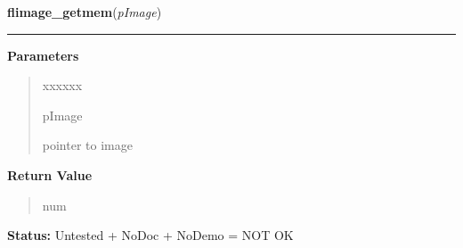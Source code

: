     \label{xformslib:flflimage:flimage_getmem}

    \vspace{0.5ex}

\hspace{.8\funcindent}\begin{boxedminipage}{\funcwidth}

    \raggedright \textbf{flimage\_getmem}(\textit{pImage})

    \vspace{-1.5ex}

    \rule{\textwidth}{0.5\fboxrule}
\setlength{\parskip}{2ex}
\setlength{\parskip}{1ex}
      \textbf{Parameters}
      \vspace{-1ex}

      \begin{quote}
        \begin{Ventry}{xxxxxx}

          \item[pImage]

          pointer to image

        \end{Ventry}

      \end{quote}

      \textbf{Return Value}
    \vspace{-1ex}

      \begin{quote}
      num

      \end{quote}

\textbf{Status:} Untested + NoDoc + NoDemo = NOT OK



    \end{boxedminipage}

    \label{xformslib:flflimage:flimage_is_supported}

    \vspace{0.5ex}

